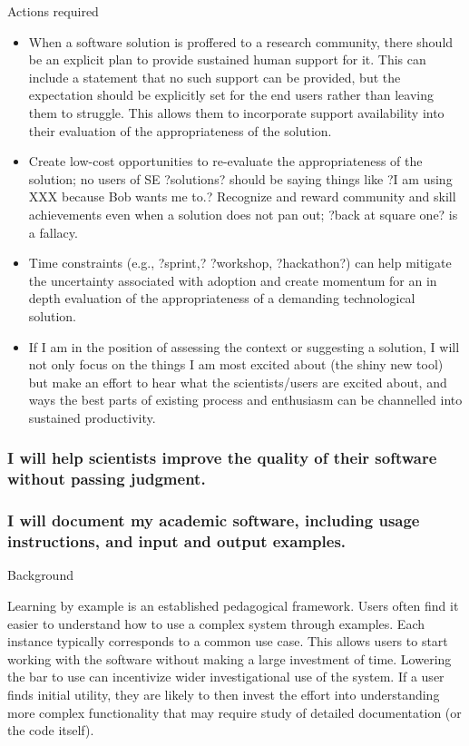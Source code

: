 \documentclass[a4paper,UKenglish]{dagman}
\renewcommand{\paragraph}[1]{\subsubsection*{#1}\xspace}
\begin{document}
Actions required
\begin{itemize}
\item When a software solution is proffered to a research community, there should be an explicit plan to provide sustained human support for it. This can include a statement that no such support can be provided, but the expectation should be explicitly set for the end users rather than leaving them to struggle. This allows them to incorporate support availability into their evaluation of the appropriateness of the solution. 
\item Create low-cost opportunities to re-evaluate the appropriateness of the solution; no users of SE ?solutions? should be saying things like ?I am using XXX because Bob wants me to.? Recognize and reward community and skill achievements even when a solution does not pan out; ?back at square one? is a fallacy.
\item Time constraints (e.g., ?sprint,? ?workshop, ?hackathon?) can help mitigate the uncertainty associated with adoption and create momentum for an in depth evaluation of the appropriateness of a demanding technological solution.
\item If I am in the position of assessing the context or suggesting a solution, I will not only focus on the things I am most excited about (the shiny new tool) but make an effort to hear what the scientists/users are excited about, and ways the best parts of existing process and enthusiasm can be channelled into sustained productivity.

\end{itemize}

\paragraph{I will help scientists improve the quality of their software without passing judgment.}


\paragraph{I will document my academic software, including usage instructions, and input and output examples.}


Background

Learning by example is an established pedagogical framework. Users often find it easier to understand how to use a complex system through examples. Each instance typically corresponds to a common use case. This allows users to start working with the software without making a large investment of time. Lowering the bar to use can incentivize wider investigational use of the system. If a user finds initial utility, they are likely to then invest the effort into understanding more complex functionality that may require study of detailed documentation (or the code itself).
\end{document}
